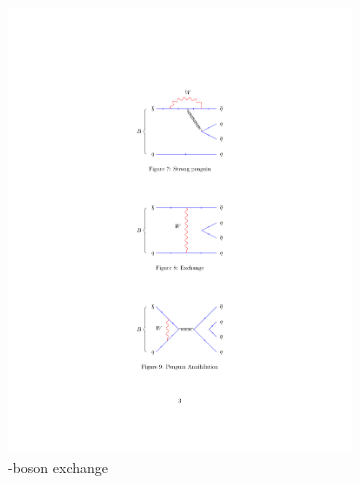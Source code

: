 \begin{figure}[!h]
\begin{subfigure}[b]{0.32\textwidth}
        \includegraphics[width=1.0\textwidth]{figs/Theory/Exch.pdf}
        \caption{\W-boson exchange}
    \end{subfigure}
    \begin{subfigure}[b]{0.32\textwidth}
        \centering

\end{subfigure}
\end{figure}
